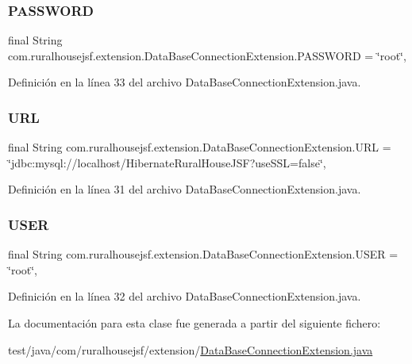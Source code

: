 \subsubsection{\texorpdfstring{PASSWORD}{PASSWORD}}
{\footnotesize\ttfamily final String com.\+ruralhousejsf.\+extension.\+Data\+Base\+Connection\+Extension.\+P\+A\+S\+S\+W\+O\+RD = \char`\"{}root\char`\"{}\hspace{0.3cm}{\ttfamily [static]}, {\ttfamily [private]}}



Definición en la línea 33 del archivo Data\+Base\+Connection\+Extension.\+java.

\mbox{\label{a00264_aec89224948925eb2f40d169ba4dc00a9}} 
\subsubsection{\texorpdfstring{URL}{URL}}
{\footnotesize\ttfamily final String com.\+ruralhousejsf.\+extension.\+Data\+Base\+Connection\+Extension.\+U\+RL = \char`\"{}jdbc\+:mysql\+://localhost/Hibernate\+Rural\+House\+J\+SF?use\+S\+SL=false\char`\"{}\hspace{0.3cm}{\ttfamily [static]}, {\ttfamily [private]}}



Definición en la línea 31 del archivo Data\+Base\+Connection\+Extension.\+java.

\mbox{\label{a00264_a87696d6ea7d62869301b08d9264182b0}} 
\subsubsection{\texorpdfstring{USER}{USER}}
{\footnotesize\ttfamily final String com.\+ruralhousejsf.\+extension.\+Data\+Base\+Connection\+Extension.\+U\+S\+ER = \char`\"{}root\char`\"{}\hspace{0.3cm}{\ttfamily [static]}, {\ttfamily [private]}}



Definición en la línea 32 del archivo Data\+Base\+Connection\+Extension.\+java.



La documentación para esta clase fue generada a partir del siguiente fichero\+:\begin{DoxyCompactItemize}
\item 
test/java/com/ruralhousejsf/extension/\mbox{\hyperlink{a00095}{Data\+Base\+Connection\+Extension.\+java}}\end{DoxyCompactItemize}

